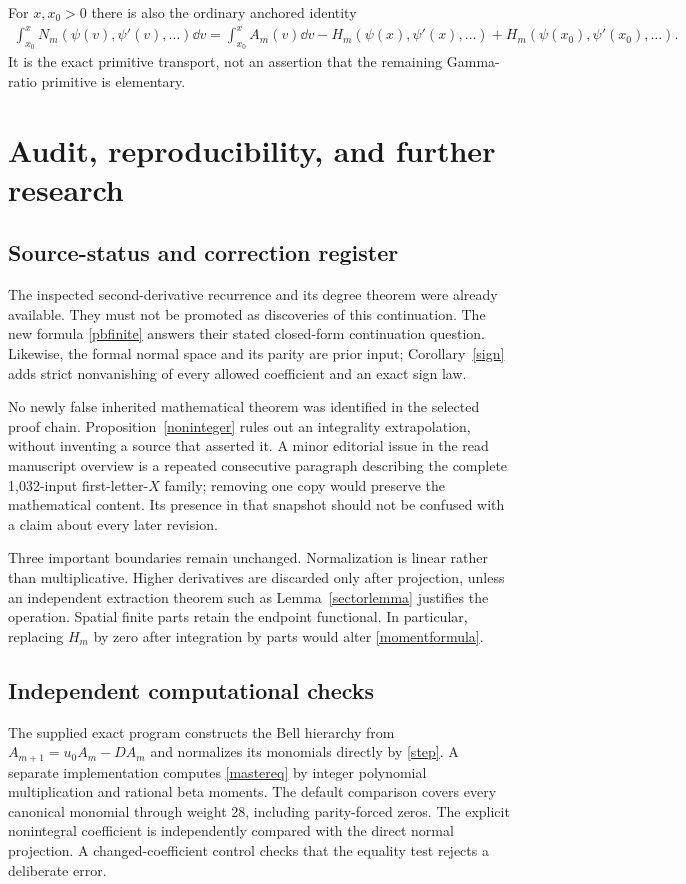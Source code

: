 \documentclass[11pt]{article}
\numberwithin{equation}{section}
\theoremstyle{definition}\newtheorem{definition}[theorem]{Definition}
\theoremstyle{remark}\newtheorem{remark}[theorem]{Remark}
\begin{document}
For $x,x_0>0$ there is also the ordinary anchored identity
\begin{equation}\label{anchor}
\begin{split}
 \int_{x_0}^xN_m(\psi(v),\psi'(v),\ldots)\dd v
 =\int_{x_0}^x A_m(v)\dd v
 -H_m(\psi(x),\psi'(x),\ldots)
 +H_m(\psi(x_0),\psi'(x_0),\ldots).
\end{split}
\end{equation}
It is the exact primitive transport, not an assertion that the remaining Gamma-ratio primitive is elementary.

\section{Audit, reproducibility, and further research}
\subsection{Source-status and correction register}
The inspected second-derivative recurrence and its degree theorem were already available. They must not be promoted as discoveries of this continuation. The new formula \eqref{pbfinite} answers their stated closed-form continuation question. Likewise, the formal normal space and its parity are prior input; Corollary~\ref{sign} adds strict nonvanishing of every allowed coefficient and an exact sign law.

No newly false inherited mathematical theorem was identified in the selected proof chain. Proposition~\ref{noninteger} rules out an integrality extrapolation, without inventing a source that asserted it. A minor editorial issue in the read manuscript overview is a repeated consecutive paragraph describing the complete 1,032-input first-letter-$X$ family; removing one copy would preserve the mathematical content. Its presence in that snapshot should not be confused with a claim about every later revision.

Three important boundaries remain unchanged. Normalization is linear rather than multiplicative. Higher derivatives are discarded only after projection, unless an independent extraction theorem such as Lemma~\ref{sectorlemma} justifies the operation. Spatial finite parts retain the endpoint functional. In particular, replacing $H_m$ by zero after integration by parts would alter \eqref{momentformula}.

\subsection{Independent computational checks}
The supplied exact program constructs the Bell hierarchy from $A_{m+1}=u_0A_m-DA_m$ and normalizes its monomials directly by \eqref{step}. A separate implementation computes \eqref{mastereq} by integer polynomial multiplication and rational beta moments. The default comparison covers every canonical monomial through weight 28, including parity-forced zeros. The explicit nonintegral coefficient is independently compared with the direct normal projection. A changed-coefficient control checks that the equality test rejects a deliberate error.
\end{document}
